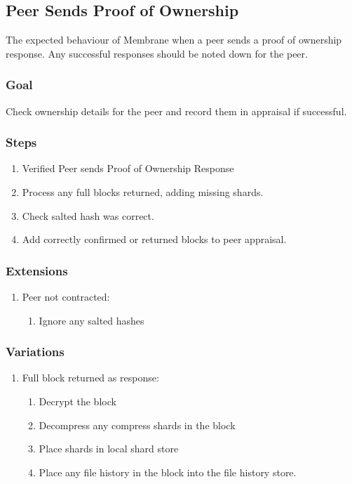 \documentclass[11pt, a4paper, twocolumn, twoside]{report}
\begin{document}
\subsection{Peer Sends Proof of Ownership}

The expected behaviour of Membrane when a peer sends a proof of ownership response. Any successful responses should be noted down for the peer.

\subsubsection{Goal}

Check ownership details for the peer and record them in appraisal if successful.

\subsubsection{Steps}

\begin{enumerate}
 \item Verified Peer sends Proof of Ownership Response
 \item Process any full blocks returned, adding missing shards.
 \item Check salted hash was correct.
 \item Add correctly confirmed or returned blocks to peer appraisal.
\end{enumerate}

\subsubsection{Extensions}
\begin{enumerate}
  \item Peer not contracted:
	\begin{enumerate}
	  \item Ignore any salted hashes
	\end{enumerate}
\end{enumerate}

\subsubsection{Variations}
\begin{enumerate}
  \item Full block returned as response:
	\begin{enumerate}
	  \item Decrypt the block
	  \item Decompress any compress shards in the block
	  \item Place shards in local shard store
	  \item Place any file history in the block into the file history store.
	\end{enumerate}
\end{enumerate}
\end{document}
